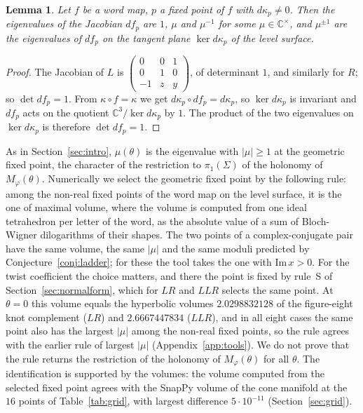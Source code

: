 \documentclass[11pt]{amsart}
\newtheorem{lemma}[conjecture]{Lemma}
\theoremstyle{definition}
\theoremstyle{remark}
\newcommand{\C}{\mathbb{C}}
\begin{document}
\begin{lemma}\label{lem:jac}
Let $f$ be a word map, $p$ a fixed point of $f$ with $d\kappa_p \ne 0$. Then the
eigenvalues of the Jacobian $df_p$ are $1$, $\mu$ and $\mu^{-1}$ for some
$\mu \in \C^\times$, and $\mu^{\pm1}$ are the eigenvalues of $df_p$ on the tangent
plane $\ker d\kappa_p$ of the level surface.
\end{lemma}

\begin{proof}
The Jacobian of $L$ is $\begin{pmatrix} 0&0&1\\0&1&0\\-1&z&y\end{pmatrix}$, of
determinant $1$, and similarly for $R$; so $\det df_p = 1$. From $\kappa\circ f =
\kappa$ we get $d\kappa_p \circ df_p = d\kappa_p$, so $\ker d\kappa_p$ is invariant
and $df_p$ acts on the quotient $\C^3/\ker d\kappa_p$ by $1$. The product of the two
eigenvalues on $\ker d\kappa_p$ is therefore $\det df_p = 1$.
\end{proof}

As in Section~\ref{sec:intro}, $\mu(\theta)$ is the eigenvalue with
$|\mu| \ge 1$ at the geometric fixed point, the character of the restriction to
$\pi_1(\Sigma)$ of the holonomy of $M_\varphi(\theta)$. Numerically we select the
geometric fixed point by the following rule: among the non-real fixed points of the
word map on the level surface, it is the one of maximal volume, where the volume is
computed from one ideal tetrahedron per letter of the word, as the absolute value of
a sum of Bloch-Wigner dilogarithms of their shapes. The two points of a
complex-conjugate pair have the same volume, the same $|\mu|$ and the same moduli
predicted by Conjecture~\ref{conj:ladder}; for these the tool takes the one with
$\mathrm{Im}\,x > 0$. For the twist coefficient the choice matters, and there the
point is fixed by rule~S of Section~\ref{sec:normalform}, which for $LR$ and $LLR$
selects the same point. At $\theta = 0$ this volume equals the hyperbolic
volumes $2.0298832128$ of the figure-eight knot complement ($LR$) and $2.6667447834$
($LLR$), and in all eight cases the same point also has the largest $|\mu|$ among the
non-real fixed points, so the rule agrees with the earlier rule of largest $|\mu|$
(Appendix~\ref{app:tools}). We do not prove that the rule returns the restriction of
the holonomy of $M_\varphi(\theta)$ for all $\theta$. The identification is supported
by the volumes: the volume computed from the selected fixed point agrees with the
SnapPy volume of the cone manifold at the $16$ points of Table~\ref{tab:grid}, with
largest difference $5\cdot10^{-11}$ (Section~\ref{sec:grid}).
\end{document}
